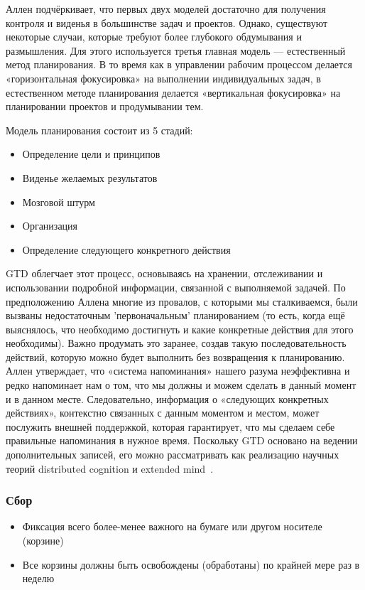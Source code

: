 \documentclass{../industrial-development}
\begin{document}
\lecturenotes

Аллен подчёркивает, что первых двух моделей достаточно для получения контроля и виденья в большинстве задач и проектов. Однако, существуют некоторые случаи, которые требуют более глубокого обдумывания и размышления. Для этого используется третья главная модель — естественный метод планирования. В то время как в управлении рабочим процессом делается «горизонтальная фокусировка» на выполнении индивидуальных задач, в естественном методе планирования делается «вертикальная фокусировка» на планировании проектов и продумывании тем. 

Модель планирования состоит из 5 стадий:
\begin{itemize}
\item Определение цели и принципов
\item Виденье желаемых результатов
\item Мозговой штурм
\item Организация
\item Определение следующего конкретного действия
\end{itemize}

GTD облегчает этот процесс, основываясь на хранении, отслеживании и использовании подробной информации, связанной с выполняемой задачей. По предположению Аллена многие из провалов, с которыми мы сталкиваемся, были вызваны недостаточным 'первоначальным' планированием (то есть, когда ещё выяснялось, что необходимо достигнуть и какие конкретные действия для этого необходимы). Важно продумать это заранее, создав такую последовательность действий, которую можно будет выполнить без возвращения к планированию. Аллен утверждает, что «система напоминания» нашего разума неэффективна и редко напоминает нам о том, что мы должны и можем сделать в данный момент и в данном месте. Следовательно, информация о «следующих конкретных действиях», контекстно связанных с данным моментом и местом, может послужить внешней поддержкой, которая гарантирует, что мы сделаем себе правильные напоминания в нужное время. Поскольку GTD основано на ведении дополнительных записей, его можно рассматривать как реализацию научных теорий distributed cognition и extended mind~\cite{GTDWikipedia}.

\begin{frame} \frametitle{Сбор}
  \begin{itemize}
  \item Фиксация всего более-менее важного на бумаге или другом носителе (корзине)
  \item Все корзины должны быть освобождены (обработаны) по крайней мере раз в неделю
  \end{itemize}
\end{frame}
\end{document}
